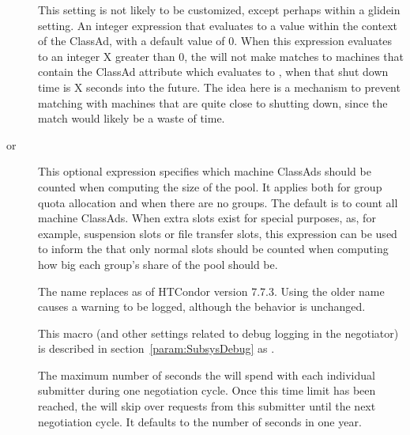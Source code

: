 \begin{description}
\label{param:NegotiatorTrimShutdownThreshold}
\item[\Macro{NEGOTIATOR\_TRIM\_SHUTDOWN\_THRESHOLD}] 
  This setting is not likely to be customized, except perhaps within 
  a glidein setting.  
  An integer expression that evaluates to a value within the context of
  the  ClassAd, 
  with a default value of 0.  
  When this expression evaluates to an integer X greater than 0, 
  the  will not make matches to machines 
  that contain the ClassAd attribute 
  which evaluates to ,
  when that shut down time is X seconds into the future.
  The idea here is a mechanism to prevent
  matching with machines that are quite close to shutting down, 
  since the match would likely be a waste of time.

\label{param:NegotiatorSlotPoolsizeConstraint}
\label{param:GroupDynamicMachConstraint}
\item[\Macro{NEGOTIATOR\_SLOT\_POOLSIZE\_CONSTRAINT} or
  \Macro{GROUP\_DYNAMIC\_MACH\_CONSTRAINT}]
  This optional expression specifies which machine ClassAds should be counted
  when computing the size of the pool.
  It applies both for group quota allocation and when there are no groups.
  The default is to count all machine ClassAds.
  When extra slots exist for special purposes,
  as, for example, suspension slots or file transfer slots,
  this expression can be used to inform the  that 
  only normal slots should be counted when computing how big each group's 
  share of the pool should be.
 
  The name  replaces
   as of HTCondor version 7.7.3.
  Using the older name causes a warning to be logged, although the
  behavior is unchanged.

\label{param:NegotiatorDebug}
\item[\Macro{NEGOTIATOR\_DEBUG}]
  This macro (and other settings related to debug logging in the negotiator) is
  described in section~\ref{param:SubsysDebug} as .

\label{param:NegotiatorMaxTimePerSubmitter}
\item[\Macro{NEGOTIATOR\_MAX\_TIME\_PER\_SUBMITTER}]
  The maximum number of seconds
  the  will spend with each individual submitter during one
  negotiation cycle.  Once this time limit has been reached, the
   will skip
  over requests from this submitter until the next negotiation cycle.
  It defaults to the number of seconds in one year.


\end{description}
